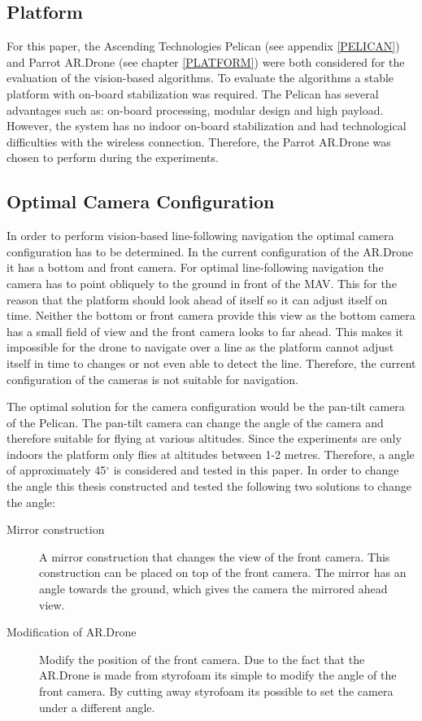 \documentclass[a4paper]{article}
\begin{document}
\subsection{Platform}
For this paper, the Ascending Technologies Pelican (see appendix \ref{PELICAN}) and Parrot AR.Drone (see chapter \ref{PLATFORM}) were both considered for the evaluation of the vision-based algorithms. To evaluate the algorithms a stable platform with on-board stabilization was required. The Pelican has several advantages such as: on-board processing, modular design and high payload. However, the system has no indoor on-board stabilization and had technological difficulties with the wireless connection. Therefore, the Parrot AR.Drone was chosen to perform during the experiments.

\subsection{Optimal Camera Configuration}
In order to perform vision-based line-following navigation the optimal camera configuration has to be determined. In the current configuration of the AR.Drone it has a bottom and front camera. For optimal line-following navigation the camera has to point obliquely to the ground in front of the MAV. This for the reason that the platform should look ahead of itself so it can adjust itself on time. Neither the bottom or front camera provide this view as the bottom camera has a small field of view and the front camera looks to far ahead. This makes it impossible for the drone to navigate over a line as the platform cannot adjust itself in time to changes or not even able to detect the line. Therefore, the current configuration of the cameras is not suitable for navigation.

The optimal solution for the camera configuration would be the pan-tilt camera of the Pelican. The pan-tilt camera can change the angle of the camera and therefore suitable for flying at various altitudes. Since the experiments are only indoors the platform only flies at altitudes between 1-2 metres. Therefore, a angle of approximately 45$^{\circ}$ is considered and tested in this paper. In order to change the angle this thesis constructed and tested the following two solutions to change the angle:
\begin{description}
\item[Mirror construction] A mirror construction that changes the view of the front camera. This construction can be placed on top of the front camera. The mirror has an angle towards the ground, which gives the camera the mirrored ahead view.
\item[Modification of AR.Drone] Modify the position of the front camera. Due to the fact that the AR.Drone is made from styrofoam its simple to modify the angle of the front camera. By cutting away styrofoam its possible to set the camera under a different angle.
\end{description}
\end{document}
